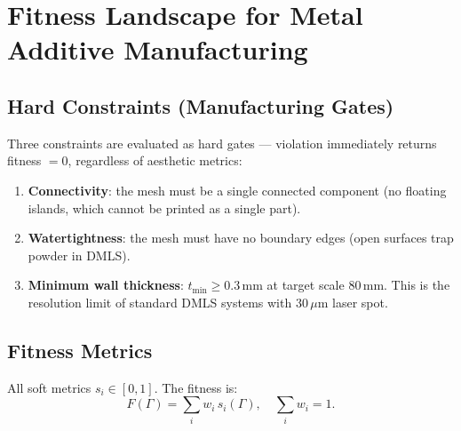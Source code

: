 \documentclass[11pt, a4paper]{article}
\begin{document}
\section{Fitness Landscape for Metal Additive Manufacturing}
\label{sec:fitness}

\subsection{Hard Constraints (Manufacturing Gates)}

Three constraints are evaluated as hard gates — violation immediately returns
fitness $= 0$, regardless of aesthetic metrics:

\begin{enumerate}
  \item \textbf{Connectivity}: the mesh must be a single connected component (no floating islands, which cannot be printed as a single part).
  \item \textbf{Watertightness}: the mesh must have no boundary edges (open surfaces trap powder in DMLS).
  \item \textbf{Minimum wall thickness}: $t_{\min} \geq 0.3\,\mathrm{mm}$ at target scale $80\,\mathrm{mm}$. This is the resolution limit of standard DMLS systems with $30\,\mu\mathrm{m}$ laser spot.
\end{enumerate}

\subsection{Fitness Metrics}

All soft metrics $s_i \in [0,1]$. The fitness is:
\begin{equation}
  F(\Gamma) = \sum_{i} w_i \, s_i(\Gamma), \quad \sum_i w_i = 1.
  \label{eq:fitness}
\end{equation}
\end{document}
